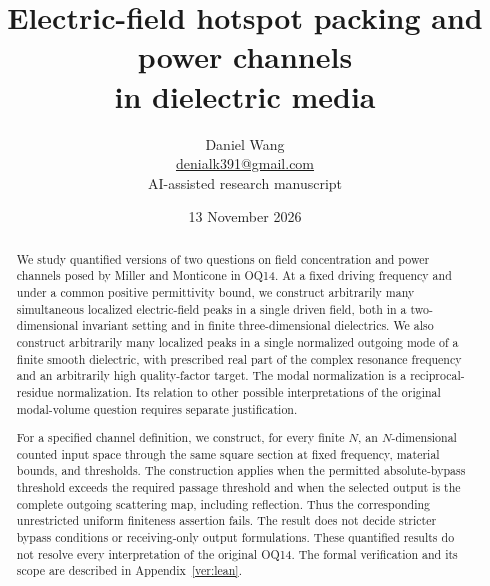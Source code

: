 \documentclass[11pt]{article}
\title{Electric-field hotspot packing and power channels\\in dielectric media}
\author{Daniel Wang\\\href{mailto:denialk391@gmail.com}{denialk391@gmail.com}\\[0.5em]AI-assisted research manuscript}
\date{13 November 2026}
\begin{document}
\maketitle
\begin{abstract}
We study quantified versions of two questions on field concentration and
power channels posed by Miller and Monticone in OQ14. At a fixed driving
frequency and under a common positive permittivity bound, we construct
arbitrarily many simultaneous localized electric-field peaks in a single
driven field, both in a two-dimensional invariant setting and in finite
three-dimensional dielectrics. We also construct arbitrarily many localized
peaks in a single normalized outgoing mode of a finite smooth dielectric,
with prescribed real part of the complex resonance frequency and an
arbitrarily high quality-factor target. The modal normalization is a
reciprocal-residue normalization.
Its relation to other possible interpretations of the original modal-volume
question requires separate justification.

For a specified channel definition, we construct, for every finite $N$,
an $N$-dimensional counted input space through the same square section
at fixed frequency, material bounds, and thresholds. The construction
applies when the permitted absolute-bypass threshold exceeds the required
passage threshold and when the selected output is the complete outgoing
scattering map, including reflection. Thus the corresponding unrestricted
uniform finiteness assertion fails. The result does not decide stricter
bypass conditions or receiving-only output formulations. These quantified
results do not resolve every interpretation of the original OQ14. The
formal verification and its scope are described in Appendix~\ref{ver:lean}.
\end{abstract}
\clearpage
{\small\linespread{0.92}\selectfont\tableofcontents}
\clearpage



















\clearpage
\appendix

\clearpage


\end{document}

